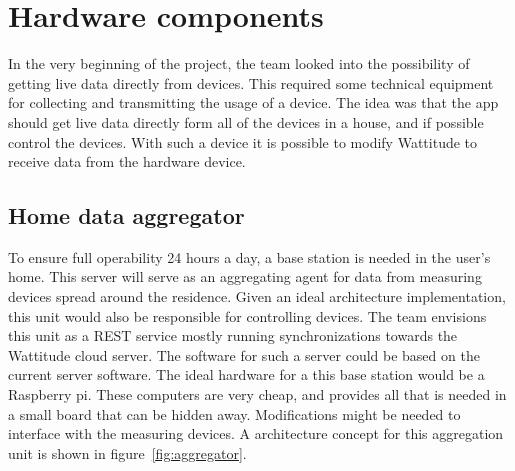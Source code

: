 \section{Hardware components}
In the very beginning of the project, the team looked into the possibility of getting live data directly from devices. This required some technical equipment for collecting and transmitting the usage of a device. The idea was that the app should get live data directly form all of the devices in a house, and if possible control the devices. With such a device it is possible to modify Wattitude to receive data from the hardware device.


\subsection{Home data aggregator}
To ensure full operability 24 hours a day, a base station is needed in the user's home. This server will serve as an aggregating agent for data from measuring devices spread around the residence. Given an ideal architecture implementation, this unit would also be responsible for controlling devices. The team envisions this unit as a REST service mostly running synchronizations towards the Wattitude cloud server. The software for such a server could be based on the current server software. The ideal hardware for a this base station would be a Raspberry pi. These computers are very cheap, and provides all that is needed in a small board that can be hidden away. Modifications might be needed to interface with the measuring devices. A architecture concept for this aggregation unit is shown in figure~\ref{fig:aggregator}.

